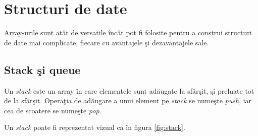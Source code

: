 




\section{Structuri de date}
Array-urile sunt atât de versatile încât pot fi folosite
pentru a construi structuri de date mai complicate, fiecare
cu avantajele şi dezavantajele sale.

\subsection{Stack şi queue}
Un \textsl{stack} este un array în care elementele sunt adăugate la sfârşit,
şi preluate tot de la sfârşit. Operaţia de adăugare a unui element
pe \textit{stack} se numeşte \textsl{push}, iar cea de scoatere se numeşte \textsl{pop}.

Un \textit{stack} poate fi reprezentat vizual ca în figura \ref{fig:stack}.

